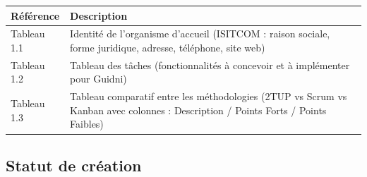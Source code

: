 \documentclass[12pt,a4paper]{article}
\begin{document}
\begin{longtable}{p{2cm} p{12cm}}
    \textbf{Référence} & \textbf{Description} \\
    \midrule
    \endhead
    
    Tableau 1.1 & Identité de l'organisme d'accueil (ISITCOM : raison sociale, forme juridique, adresse, téléphone, site web) \\
    Tableau 1.2 & Tableau des tâches (fonctionnalités à concevoir et à implémenter pour Guidni) \\
    Tableau 1.3 & Tableau comparatif entre les méthodologies (2TUP vs Scrum vs Kanban avec colonnes : Description / Points Forts / Points Faibles) \\
    \bottomrule
\end{longtable}

\subsection*{Statut de création}
\end{document}
